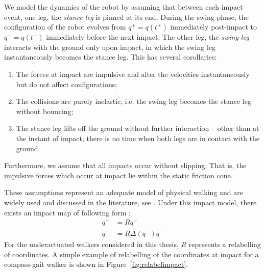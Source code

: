 We model the dynamics of the robot by assuming that between each impact event, one leg, the \textit{stance leg} is pinned at its end. During the swing phase, the configuration of the robot evolves from $q^+=q(t^+)$ immediately post-impact to $q^-=q(t^-)$ immediately before the next impact. The other leg, the \textit{swing leg} interacts with the ground only upon impact, in which the swing leg instantaneously becomes the stance leg. This has several corollaries:
\begin{enumerate}[parsep=0cm]
	\item The forces at impact are impulsive and alter the velocities instantaneously but do not affect configurations;
	\item The collisions are purely inelastic, i.e. the swing leg becomes the stance leg without bouncing;
	\item The stance leg lifts off the ground without further interaction -- other than at the instant of impact, there is no time when both legs are in contact with the ground.
\end{enumerate}
Furthermore, we assume that all impacts occur without slipping. That is, the impulsive forces which occur at impact lie within the static friction cone. 

These assumptions represent an adequate model of physical walking and are widely used and discussed in the literature, see \cite{hurmuzlu1994rigid, westervelt2007feedback}. Under this impact model, there exists an impact map of following form \cite{manchester13planning}:
\begin{subequations} \label{eqn:impact}
\begin{align}
	q^+ &= Rq^- \label{eqn:impactconfig}\\
	\dot{q}^+ &= R\Delta\left(q^-\right)\dot{q}^- \label{eqn:impactvel}
\end{align}
\end{subequations} %
For the underactuated walkers considered in this thesis, $R$ represents a relabelling of coordinates. A simple example of relabelling of the coordinates at impact for a compass-gait walker is shown in Figure~\ref{fig:relabelimpact}.

